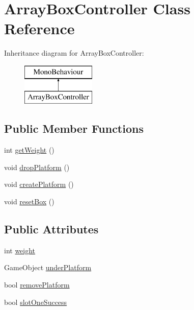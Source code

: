 \hypertarget{class_array_box_controller}{}\section{Array\+Box\+Controller Class Reference}
\label{class_array_box_controller}
Inheritance diagram for Array\+Box\+Controller\+:\begin{figure}[H]
\begin{center}
\leavevmode
\includegraphics[height=2.000000cm]{class_array_box_controller}
\end{center}
\end{figure}
\subsection*{Public Member Functions}
\begin{DoxyCompactItemize}
\item 
int \hyperlink{class_array_box_controller_aca5b840fdc879a3268c9a57a439d6172}{get\+Weight} ()
\item 
void \hyperlink{class_array_box_controller_a926861290e0d8414a771456f9d573659}{drop\+Platform} ()
\item 
void \hyperlink{class_array_box_controller_aaee7f59464d3cddf435e9669faacd8aa}{create\+Platform} ()
\item 
void \hyperlink{class_array_box_controller_a457e96d6ccf856144d580f392dcc17e8}{reset\+Box} ()
\end{DoxyCompactItemize}
\subsection*{Public Attributes}
\begin{DoxyCompactItemize}
\item 
int \hyperlink{class_array_box_controller_a0703f2b4690bc71070aa58210187a4f5}{weight}
\item 
Game\+Object \hyperlink{class_array_box_controller_a7d14b3ed04e57ed25f856c76bc91bba3}{under\+Platform}
\item 
bool \hyperlink{class_array_box_controller_af7f266ad7922670c221e4a2247308f03}{remove\+Platform}
\item 
bool \hyperlink{class_array_box_controller_a788b69c1dd5fd14ada59788891a50ec2}{slot\+One\+Success}
\end{DoxyCompactItemize}


